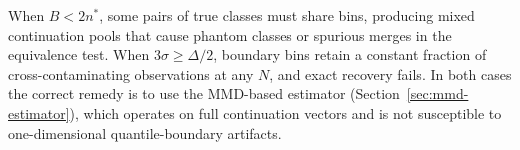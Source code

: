 \begin{remark}
When $B < 2n^*$, some pairs of true classes must share bins, producing mixed
continuation pools that cause phantom classes or spurious merges in the equivalence test.
When $3\sigma \geq \Delta/2$, boundary bins retain a constant fraction of
cross-contaminating observations at any $N$, and exact recovery fails.
In both cases the correct remedy is to use the MMD-based estimator
(Section~\ref{sec:mmd-estimator}), which operates on full continuation vectors
and is not susceptible to one-dimensional quantile-boundary artifacts.
\end{remark}
